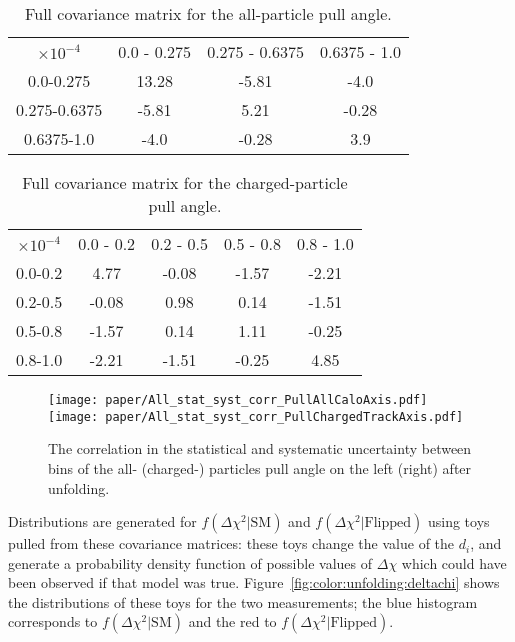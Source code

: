 \begin{table}
    \centering
    \begin{tabular}{ cccc }
      \toprule
      $\times 10^{-4}$ & 0.0 - 0.275 & 0.275 - 0.6375 & 0.6375 - 1.0 \\
      \cmidrule(r){2-4}
      0.0-0.275        & 13.28       & -5.81          & -4.0         \\
      0.275-0.6375     & -5.81       & 5.21           & -0.28        \\
      0.6375-1.0       & -4.0        & -0.28          & 3.9          \\
      \bottomrule
    \end{tabular}
    \caption{Full covariance matrix for the all-particle pull angle.}
    \label{tab:color:unfolding:all_cov_matrix}
\end{table}
%
\begin{table}
    \centering
    \begin{tabular}{ ccccc }
      \toprule
      $\times 10^{-4}$ & 0.0 - 0.2 & 0.2 - 0.5 & 0.5 - 0.8 & 0.8 - 1.0 \\
      \cmidrule(r){2-5}
      0.0-0.2          & 4.77      & -0.08     & -1.57     & -2.21     \\
      0.2-0.5          & -0.08     & 0.98      & 0.14      & -1.51     \\
      0.5-0.8          & -1.57     & 0.14      & 1.11      & -0.25     \\
      0.8-1.0          & -2.21     & -1.51     & -0.25     & 4.85      \\
      \bottomrule
    \end{tabular}
    \caption{Full covariance matrix for the charged-particle pull angle.}
    \label{tab:color:unfolding:charged_cov_matrix}
\end{table}

\begin{figure}[htbp]
  \centering
    \texttt{[image: paper/All\_stat\_syst\_corr\_PullAllCaloAxis.pdf]}\texttt{[image: paper/All\_stat\_syst\_corr\_PullChargedTrackAxis.pdf]}
  \caption{The correlation in the statistical and systematic uncertainty between bins of the all- (charged-) particles pull angle on the left (right) after unfolding.}
  \label{fig:color:unfolding:correlations}
\end{figure}

	Distributions are generated for $f(\Delta \chi^2 | \mathrm{SM})$ and $f(\Delta \chi^2 | \mathrm{Flipped})$ using toys pulled from these covariance matrices: these toys change the value of the $d_i$, and generate a probability density function of possible values of $\Delta \chi$ which could have been observed if that model was true. Figure~\ref{fig:color:unfolding:deltachi} shows the distributions of these toys for the two measurements; the blue histogram corresponds to $f(\Delta \chi^2 | \mathrm{SM})$ and the red to $f(\Delta \chi^2 | \mathrm{Flipped})$.

